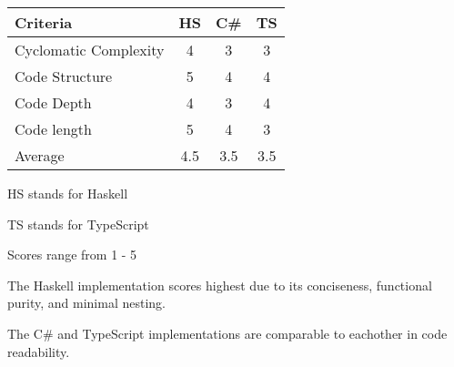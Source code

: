 \begin{table}[h]
  \centering
  \begin{threeparttable}
    \begin{tabular}{l|c|c|c}
      \toprule
      Criteria              & HS & C\# & TS \\
      \midrule
      Cyclomatic Complexity & 4   & 3   & 3  \\
      Code Structure        & 5   & 4   & 4  \\
      Code Depth            & 4   & 3   & 4  \\
      Code length           & 5   & 4   & 3  \\
      \hline
      Average               & 4.5 & 3.5 & 3.5 \\
      \bottomrule
    \end{tabular}
    \begin{tablenotes}
      \scriptsize
      \item[]  HS stands for Haskell
      \item[]  TS stands for TypeScript
      \item[]  Scores range from 1 - 5
    \end{tablenotes}
  \end{threeparttable}
\end{table}

The Haskell implementation scores highest due to its conciseness, functional purity,
and minimal nesting.

The C\# and TypeScript implementations are comparable to eachother in code readability.
